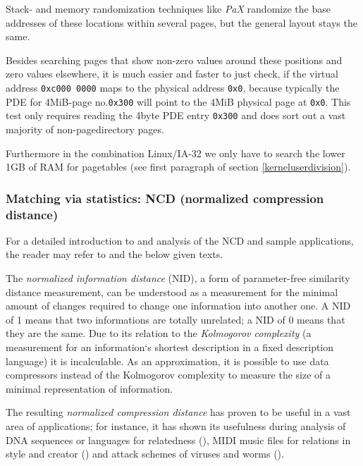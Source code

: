 Stack- and memory randomization techniques like \emph{PaX} randomize the base
addresses of these locations within several pages, but the general layout stays
the same.

Besides searching pages that show non-zero values around these positions and
zero values elsewhere, it is much easier and faster to just check, if the
virtual address \texttt{0xc000~0000} maps to the physical address \texttt{0x0},
because typically the PDE for 4MiB-page no.\@ \texttt{0x300} will point to the
4MiB physical page at \texttt{0x0}. This test only requires reading the 4byte
PDE entry \texttt{0x300} and does sort out a vast majority of non-pagedirectory
pages.

Furthermore in the combination Linux/IA-32 we only have to search the lower 1GB
of RAM for pagetables (see first paragraph of section \ref{kerneluserdivision}).



\subsubsection{Matching via statistics: NCD (normalized compression distance)}

\label{ATTstatistics}

For a detailed introduction to and analysis of the NCD and sample applications,
the reader may refer to \cite{kolmogorov:1997} and the below given texts.

The \emph{normalized information distance} (NID), a form of parameter-free
similarity distance measurement, can be understood as a measurement for the
minimal amount of changes required to change one information into another one.
A NID of 1 means that two informations are totally unrelated; a NID of 0 means
that they are the same.  Due to its relation to the \emph{Kolmogorov complexity}
(a measurement for an information`s shortest description in a fixed description
language) it is incalculable.  As an approximation, it is possible to use data
compressors instead of the Kolmogorov complexity to measure the size of a
minimal representation of information.

%

The resulting \emph{normalized compression distance} has proven to be useful in
a vast area of applications; for instance, it has shown its usefulness during
analysis of DNA sequences or languages for relatedness
(\cite{clustering_by_compression:2005,similarity_matrix:2004}), MIDI music files
for relations in style and creator (\cite{clustering_by_compression:2005}) and
attack schemes of viruses and worms (\cite{analysing_worms_with_ncd:2006}).

